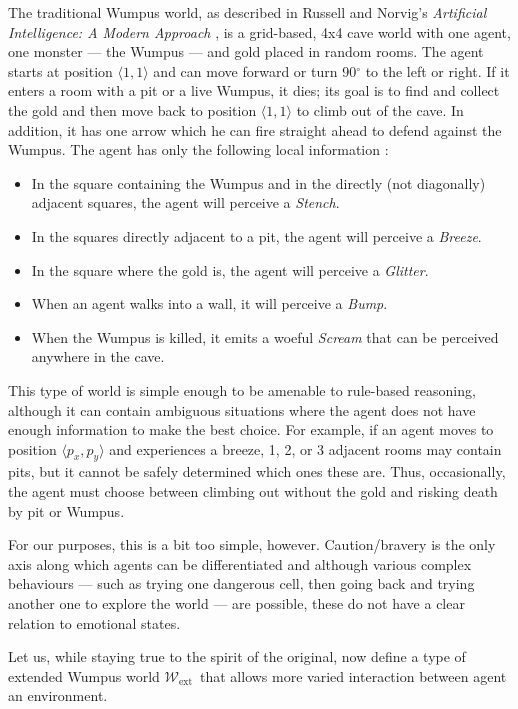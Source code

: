 \documentclass[]{scrartcl}
\theoremstyle{break}
\newcommand{\wext}{\ensuremath{\mathcal{W}_{\mathrm{ext}}}}
\begin{document}
The traditional Wumpus world, as described in Russell and Norvig's {\em Artificial Intelligence: A Modern Approach} \cite[p. 236]{norvig}, is a grid-based, 4x4 cave world with one agent, one monster --- the Wumpus --- and gold placed in random rooms. The agent starts at position $\langle 1,1\rangle$ and can move forward or turn 90$^\circ$ to the left or right. If it enters a room with a pit or a live Wumpus, it dies; its goal is to find and collect the gold and then move back to position $\langle 1,1\rangle$ to climb out of the cave. In addition, it has one arrow which he can fire straight ahead to defend against the Wumpus. The agent has only the following local information \cite[p. 237]{norvig}:
\begin{itemize}
	\item In the square containing the Wumpus and in the directly (not diagonally) adjacent squares, the agent will perceive a {\em Stench}.
	\item In the squares directly adjacent to a pit, the agent will perceive a {\em Breeze}.
	\item In the square where the gold is, the agent will perceive a {\em Glitter}.
	\item When an agent walks into a wall, it will perceive a {\em Bump}.
	\item When the Wumpus is killed, it emits a woeful {\em Scream} that can be perceived anywhere in the cave.
\end{itemize}

This type of world is simple enough to be amenable to rule-based reasoning, although it can contain ambiguous situations where the agent does not have enough information to make the best choice. For example, if an agent moves to position $\langle p_x,p_y \rangle$ and experiences a breeze, 1, 2, or 3 adjacent rooms may contain pits, but it cannot be safely determined which ones these are. Thus,  occasionally, the agent must choose between climbing out without the gold and risking death by pit or Wumpus.

For our purposes, this is a bit too simple, however. Caution/bravery is the only axis along which agents can be differentiated and although various complex behaviours --- such as trying one dangerous cell, then going back and trying another one to explore the world --- are possible, these do not have a clear relation to emotional states.

Let us, while staying true to the spirit of the original, now define a type of extended Wumpus world \wext\ that allows more varied interaction between agent an environment.
\end{document}
